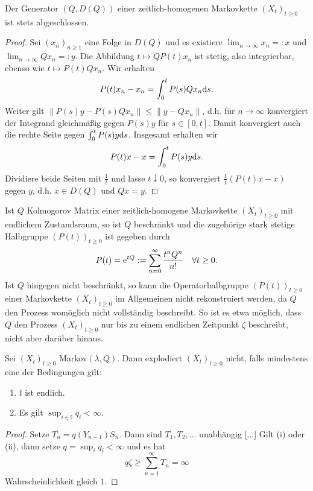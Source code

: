 \begin{prop}
  Der Generator  $(Q, D(Q))$  einer zeitlich-homogenen Markovkette $(X_t)_{t\geq0}$ ist stets abgeschlossen.
\end{prop}

\begin{proof}
  Sei $(x_n)_{n\geq1}$ eine Folge in $D(Q)$ und es existiere $\lim_{n\to\infty}x_n=:x$ und $ \lim_{n\to\infty}Q x_n=:y$. Die Abbildung $t\mapsto QP(t)x_n$ ist stetig, also integrierbar, ebenso wie $t\mapsto P(t)Qx_n$. Wir erhalten $$P(t)x_n-x_n=\int_0^t P(s)Qx_n\text ds.$$ Weiter gilt $\|P(s)y-P(s)Qx_n\|\leq\|y-Qx_n\|$, d.h. für $n\to\infty$ konvergiert der Integrand gleichmäßig gegen $P(s)y$ für $s\in[0, t]$. Damit konvergiert auch die rechte Seite  gegen $\int_0^t P(s)y \text ds$. Insgesamt erhalten wir $$P(t)x-x=\int_0^t P(s)y\text ds.$$ Dividiere beide Seiten mit $\frac{1}{t}$ und lasse $t\downarrow 0$, so konvergiert $\frac{1}{t}(P(t)x-x)$ gegen $y$, d.h. $x\in D(Q)$ und $Qx=y$.
\end{proof}



\begin{bem} Ist $Q$ Kolmogorov Matrix einer zeitlich-homogene Markovkette $(X_t)_{t\geq0}$ mit endlichem Zustandsraum, so ist $Q$ beschränkt  und die zugehörige stark stetige Halbgruppe $(P(t))_{t\geq0}$ ist  gegeben durch $$P(t)=\textnormal e^{tQ}:=\sum_{n=0}^\infty\frac{t^n Q^n}{n!}\quad\forall t\geq0.$$Ist $Q$ hingegen nicht beschränkt, so kann die Operatorhalbgruppe $(P(t))_{t\geq0}$ einer Markovkette $(X_t)_{t\geq 0}$ im  Allgemeinen  nicht rekonstruiert werden, da $Q$ den Prozess womöglich nicht vollständig beschreibt. So ist es etwa möglich, dass $Q$ den Prozess $(X_t)_{t\geq0}$ nur bis zu einem endlichen Zeitpunkt $\zeta$ beschreibt, nicht aber darüber hinaus.
\end{bem}




 
\begin{prop}
  Sei $(X_t)_{t\geq0}$ Markov$(\lambda, Q)$. Dann explodiert $(X_t)_{t\geq0}$ nicht, falls mindestens eine der Bedingungen gilt:
  \begin{enumerate}
      \item $\mathbb I$ ist endlich.
      \item Es gilt $\sup_{i\in\mathbb I}q_i< \infty$.
  \end{enumerate}
\end{prop}

\begin{proof}
  Setze $T_n=q(Y_{n-1})S_n$. Dann sind $T_1,T_2,\dots$ unabhängig [...]
  Gilt (i) oder (ii), dann setze $q=\sup_i q_i<\infty$ und es hat $$q\zeta\geq\sum_{n=1}^\infty T_n=\infty$$ Wahrscheinlichkeit gleich $1$.
\end{proof}
 


